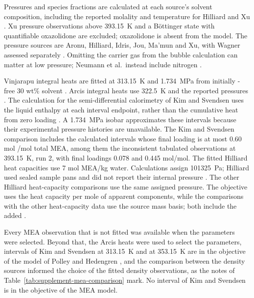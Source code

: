 \documentclass[a4paper,11pt]{article}
\begin{document}
Pressures and species fractions are calculated at each source's solvent composition, including the reported molality and temperature for Hilliard and Xu \cite{Hilliard2008,Xu2011}.
 Xu pressure observations above \SI{393.15}{\kelvin} and a B\"ottinger state with quantifiable oxazolidone are excluded; oxazolidone is absent from the model.
The pressure sources are Aronu, Hilliard, Idris, Jou, Ma'mun and Xu, with Wagner assessed separately \cite{Aronu2011,Hilliard2008,idrisSpeciationMEACO2Adducts2014,Jou1995,Mamun2005,Xu2011,wagnerSolubilityCarbonDioxide2013}.
Omitting the carrier gas from the bubble calculation can matter at low \COtwo pressure; Neumann et al.\ instead include nitrogen \cite{neumannNewModelCombining2022}.

Vinjarapu integral heats are fitted at \SI{313.15}{\kelvin} and \SI{1.734}{\mega\pascal} from initially \COtwo-free 30 wt\% solvent \cite{HemaBhavya2025}.
Arcis integral heats use \SI{322.5}{\kelvin} and the reported pressures \cite{arcisEnthalpySolutionCarbon2011}.
The calculation for the semi-differential calorimetry of Kim and Svendsen uses the liquid enthalpy at each interval endpoint, rather than the cumulative heat from zero loading \cite{Kim2007}.
A \SI{1.734}{\mega\pascal} isobar approximates these intervals because their experimental pressure histories are unavailable.
The Kim and Svendsen comparison includes the calculated intervals whose final loading is at most 0.60 mol \COtwo/mol total MEA, among them the  inconsistent tabulated observations at \SI{393.15}{\kelvin}, run 2, with final loadings 0.078 and 0.445 mol/mol.
The fitted Hilliard heat capacities use 7 mol MEA/kg water.
Calculations assign \SI{101325}{\pascal}; Hilliard used sealed sample pans and did not report their internal pressure \cite{Hilliard2008}.
The other Hilliard heat-capacity comparisons use the same assigned pressure.
The objective uses the heat capacity per mole of apparent components, while the comparisons with the other heat-capacity data use the source mass basis; both include the added \COtwo.

Every MEA observation that is not fitted was available when the parameters were selected.
Beyond that, the Arcis heats were used to select the parameters,  intervals of Kim and Svendsen at \SI{313.15}{\kelvin} and  at \SI{353.15}{\kelvin} are in the objective of the model of Polley and Hedengren \cite{polleyReactiveEPCSAFTModeling2026}, and the comparison between the density sources informed the choice of the fitted density observations, as the notes of Table~\ref{tab:supplement-mea-comparison} mark.
No interval of Kim and Svendsen is in the objective of the MEA model.
\end{document}
